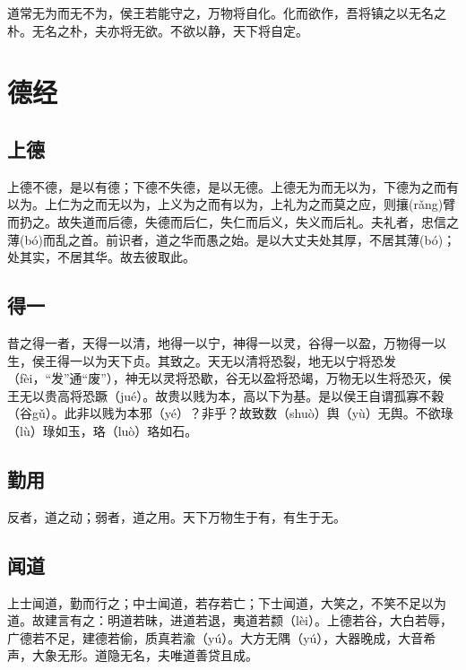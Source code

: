 \documentclass[a4paper,12pt,UTF8,twoside]{ctexbook}
\begin{document}
	
	
	
	
	
	道常无为而无不为，侯王若能守之，万物将自化。化而欲作，吾将镇之以无名之朴。无名之朴，夫亦将无欲。不欲以静，天下将自定。	
	
	
	
	
	
	\part{德经}
	
	\chapter{上德}
	上德不德，是以有德；下德不失德，是以无德。上德无为而无以为，下德为之而有以为。上仁为之而无以为，上义为之而有以为，上礼为之而莫之应，则攘(rǎng)臂而扔之。故失道而后德，失德而后仁，失仁而后义，失义而后礼。夫礼者，忠信之薄(bó)而乱之首。前识者，道之华而愚之始。是以大丈夫处其厚，不居其薄(bó)；处其实，不居其华。故去彼取此。
	
	
	
	
	\chapter{得一}
	昔之得一者，天得一以清，地得一以宁，神得一以灵，谷得一以盈，万物得一以生，侯王得一以为天下贞。其致之。天无以清将恐裂，地无以宁将恐发（fèi，“发”通“废”），神无以灵将恐歇，谷无以盈将恐竭，万物无以生将恐灭，侯王无以贵高将恐蹶（jué）。故贵以贱为本，高以下为基。是以侯王自谓孤寡不穀（谷gǔ）。此非以贱为本邪（yé）？非乎？故致数（shuò）舆（yù）无舆。不欲琭（lù）琭如玉，珞（luò）珞如石。
	
	
	

	\chapter{勤用}
	反者，道之动；弱者，道之用。天下万物生于有，有生于无。
	
	
	
	
	\chapter{闻道}
	上士闻道，勤而行之；中士闻道，若存若亡；下士闻道，大笑之，不笑不足以为道。故建言有之：明道若昧，进道若退，夷道若颣（lèi）。上德若谷，大白若辱，广德若不足，建德若偷，质真若渝（yú）。大方无隅（yú），大器晚成，大音希声，大象无形。道隐无名，夫唯道善贷且成。 
	
	
	
\end{document}
